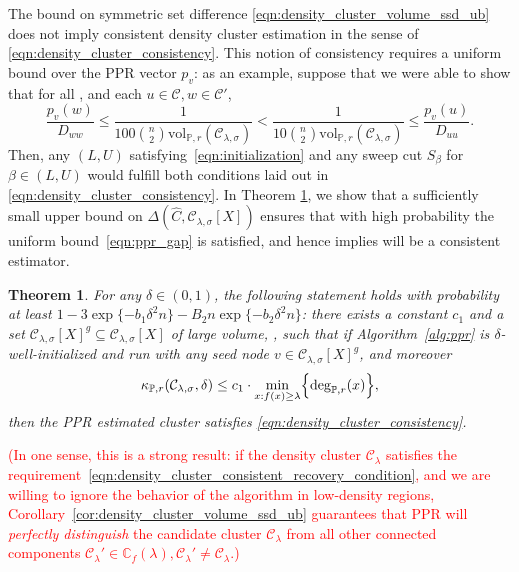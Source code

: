 \documentclass{article}
\newcommand{\vol}{\mathrm{vol}}
\newcommand{\1}{\mathbf{1}}
\newcommand{\mc}[1]{\mathcal{#1}}
\newcommand{\Pbb}{\mathbb{P}}
\newcommand{\wh}[1]{\widehat{#1}}
\newtheorem{theorem}{Theorem}[section]
\theoremstyle{definition}
\theoremstyle{remark}
\begin{document}
The bound on symmetric set difference \eqref{eqn:density_cluster_volume_ssd_ub} does not imply consistent density cluster estimation in the sense of \eqref{eqn:density_cluster_consistency}. This notion of consistency requires a
uniform bound over the PPR vector $p_v$: as an example, suppose that we were
able to show that for all \smash{$\mc{C}' \in \mathbb{C}_f(\lambda), \mc{C}' \neq \mc{C}$}, and each $u \in \mc{C}, w \in \mc{C}'$,  
\begin{equation}
\label{eqn:ppr_gap}
\frac{p_v(w)}{D_{ww}} \leq \frac{1}{100 {n \choose 2} \vol_{\Pbb,r}(\mc{C}_{\lambda,\sigma})} <
\frac{1}{10 {n \choose 2} \vol_{\Pbb,r}(\mc{C}_{\lambda,\sigma})} \leq \frac{p_v(u)}{D_{uu}}. 
\end{equation}
Then, any $(L,U)$ satisfying~\eqref{eqn:initialization} and any sweep cut
$S_{\beta}$ for $\beta \in (L,U)$ would fulfill both conditions laid out in
\eqref{eqn:density_cluster_consistency}. In Theorem 
\ref{thm:density_cluster_consistent_recovery}, we show that a sufficiently 
small upper bound on $\Delta(\wh{C},\mc{C}_{\lambda,\sigma}[X])$ ensures that with high probability the uniform bound~\eqref{eqn:ppr_gap} is satisfied, and hence implies
\smash{$\wh{C}$} will be a consistent estimator.
\begin{theorem}
	\label{thm:density_cluster_consistent_recovery}
	For any $\delta \in (0,1)$, the following statement holds with probability at least $1 - 3\exp\{-b_1\delta^2n\} - B_2n\exp\{-b_2\delta^2n\}$: there exists a constant $c_1$ and a set $\mc{C}_{\lambda,\sigma}[X]^g \subseteq \mc{C}_{\lambda,\sigma}[X]$ of large volume,  \smash{$\vol_{n,r}(\mc{C}_{\lambda,\sigma}[X]^g) \geq\vol_{n,r}(\mc{C}_{\lambda,\sigma}[X])/2$}, such that if Algorithm~\ref{alg:ppr} is $\delta$-well-initialized and run with any seed node $v \in \mc{C}_{\lambda,\sigma}[X]^g$, and moreover
	\begin{equation}
	\label{eqn:density_cluster_consistent_recovery_condition}
	\kappa_{\Pbb,r}(\mc{C}_{\lambda,\sigma},\delta) \leq c_1 \cdot \min_{x: f(x) \geq \lambda} \Bigl\{\deg_{\Pbb,r}(x)\Bigr\},
	\end{equation}
	then the PPR estimated cluster \smash{$\wh{C}$} satisfies \eqref{eqn:density_cluster_consistency}.
\end{theorem}
\textcolor{red}{(In one sense, this is a strong result: if the density cluster $\mc{C}_{\lambda}$ satisfies the requirement~\eqref{eqn:density_cluster_consistent_recovery_condition}, and we are willing to ignore the behavior of the algorithm in low-density regions, Corollary~\ref{cor:density_cluster_volume_ssd_ub} guarantees that PPR will \emph{perfectly distinguish} the candidate cluster $\mc{C}_{\lambda}$ from all other connected components $\mc{C}_{\lambda}' \in \mathbb{C}_f(\lambda), \mc{C}_\lambda' \not= \mc{C}_{\lambda}$.)}\vspace{1 mm}
\end{document}
